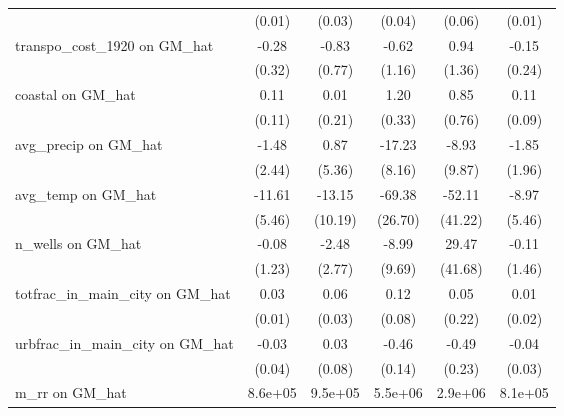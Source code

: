 \begin{table}[htbp]
\begin{tabular}{l*{5}{c}}
                &   (0.01)         &   (0.03)         &   (0.04)         &   (0.06)         &   (0.01)         \\
\addlinespace
transpo\_cost\_1920 on GM\_hat&    -0.28         &    -0.83         &    -0.62         &     0.94         &    -0.15         \\
                &   (0.32)         &   (0.77)         &   (1.16)         &   (1.36)         &   (0.24)         \\
\addlinespace
coastal on GM\_hat&     0.11         &     0.01         &     1.20\sym{***}&     0.85         &     0.11         \\
                &   (0.11)         &   (0.21)         &   (0.33)         &   (0.76)         &   (0.09)         \\
\addlinespace
avg\_precip on GM\_hat&    -1.48         &     0.87         &   -17.23\sym{*}  &    -8.93         &    -1.85         \\
                &   (2.44)         &   (5.36)         &   (8.16)         &   (9.87)         &   (1.96)         \\
\addlinespace
avg\_temp on GM\_hat&   -11.61\sym{*}  &   -13.15         &   -69.38\sym{**} &   -52.11         &    -8.97         \\
                &   (5.46)         &  (10.19)         &  (26.70)         &  (41.22)         &   (5.46)         \\
\addlinespace
n\_wells on GM\_hat&    -0.08         &    -2.48         &    -8.99         &    29.47         &    -0.11         \\
                &   (1.23)         &   (2.77)         &   (9.69)         &  (41.68)         &   (1.46)         \\
\addlinespace
totfrac\_in\_main\_city on GM\_hat&     0.03         &     0.06         &     0.12         &     0.05         &     0.01         \\
                &   (0.01)         &   (0.03)         &   (0.08)         &   (0.22)         &   (0.02)         \\
\addlinespace
urbfrac\_in\_main\_city on GM\_hat&    -0.03         &     0.03         &    -0.46\sym{***}&    -0.49\sym{*}  &    -0.04         \\
                &   (0.04)         &   (0.08)         &   (0.14)         &   (0.23)         &   (0.03)         \\
\addlinespace
m\_rr on GM\_hat  &  8.6e+05\sym{***}&  9.5e+05\sym{*}  &  5.5e+06\sym{***}&  2.9e+06         &  8.1e+05\sym{***}\\

\end{tabular}
\end{table}
